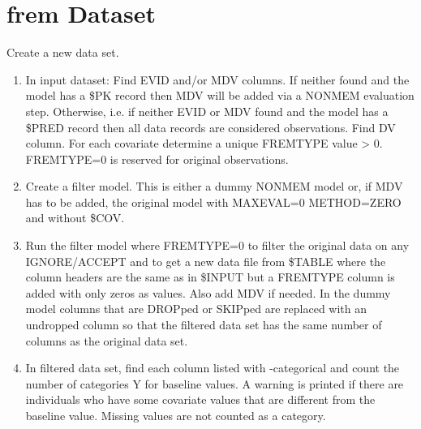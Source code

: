 \section{frem Dataset}
Create a new data set.
\begin{enumerate}
	\item In input dataset: Find EVID and/or MDV columns. If neither found and the model
    has a \$PK record then MDV will be added via a NONMEM evaluation step.
    Otherwise, i.e. if neither EVID or MDV found and the model
    has a \$PRED record then all data records are considered observations. Find DV column.
    For each covariate  determine a unique %
    FREMTYPE value %
    > 0.
    FREMTYPE=0 is reserved for original observations.
    \item Create a filter model. This is either a dummy NONMEM model or, if MDV has to be added,
    the original model with MAXEVAL=0 METHOD=ZERO and without \$COV.
	\item Run the filter model where FREMTYPE=0 to filter the original data on any IGNORE/ACCEPT and to get a new data file
    from \$TABLE where the column headers are the same as in \$INPUT but a FREMTYPE column is added with only zeros as values.
    Also add MDV if needed. In the dummy model columns that are DROPped or SKIPped are replaced with an undropped column so that the filtered data set has the same number of columns as the original data set.
    \item In filtered data set,
    find each column listed with -categorical and count the number of categories Y for baseline values.
    A warning is printed if there are individuals who have some covariate values that are different from the
    baseline value. Missing values are not counted as a category.


\end{enumerate}
